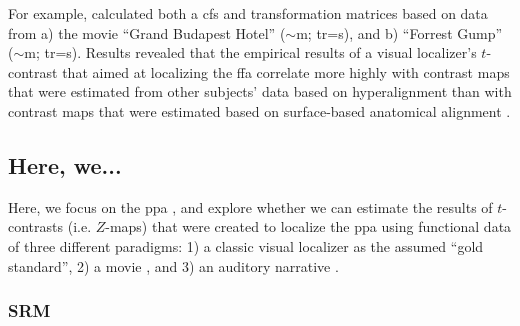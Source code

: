 For example, \citet{jiahui2020predicting} calculated both a \ac{cfs} and
transformation matrices based on data from a) the movie ``Grand Budapest Hotel''
($\sim$\unit[50]{m}; \ac{tr}=\unit[1]{s}), and b) ``Forrest Gump''
($\sim$\unit[120]{m}; \ac{tr}=\unit[2]{s}).
Results revealed that the empirical results of a visual localizer's $t$-contrast
that aimed at localizing the \ac{ffa} correlate more highly with contrast maps
that were estimated from other subjects' data based on hyperalignment than with
contrast maps that were estimated based on surface-based anatomical alignment
\citep{jiahui2020predicting}.



\subsection{Here, we...}


Here, we focus on the \ac{ppa} \citep[e.g.,][for reviews]{epstein2014neural,
aminoff2013role}, and explore whether we can estimate the results of
$t$-contrasts (i.e. $Z$-maps) that were created to localize the \ac{ppa} using
functional data of three different paradigms:
%
1) a classic visual localizer \citep{sengupta2016extension} as the assumed
``gold standard'',
%
2) a movie \citep{haeusler2022processing}, and
%
3) an auditory narrative \citep{haeusler2022processing}.


\subsubsection{SRM}




